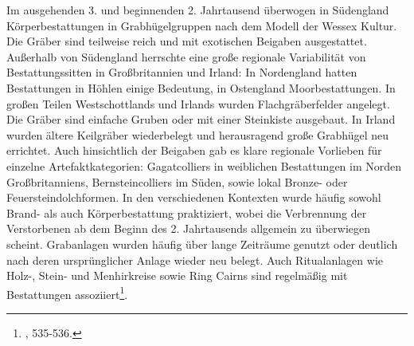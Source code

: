 \documentclass[openany,twoside,twocolumn]{book}
\let\rmarkdownfootnote\footnote%
\def\footnote{\protect\rmarkdownfootnote}
\begin{document}
Im ausgehenden 3. und beginnenden 2. Jahrtausend überwogen in Südengland Körperbestattungen in Grabhügelgruppen nach dem Modell der Wessex Kultur. Die Gräber sind teilweise reich und mit exotischen Beigaben ausgestattet. Außerhalb von Südengland herrschte eine große regionale Variabilität von Bestattungssitten in Großbritannien und Irland: In Nordengland hatten Bestattungen in Höhlen einige Bedeutung, in Ostengland Moorbestattungen. In großen Teilen Westschottlands und Irlands wurden Flachgräberfelder angelegt. Die Gräber sind einfache Gruben oder mit einer Steinkiste ausgebaut. In Irland wurden ältere Keilgräber wiederbelegt und herausragend große Grabhügel neu errichtet. Auch hinsichtlich der Beigaben gab es klare regionale Vorlieben für einzelne Artefaktkategorien: Gagatcolliers in weiblichen Bestattungen im Norden Großbritanniens, Bernsteincolliers im Süden, sowie lokal Bronze- oder Feuersteindolchformen. In den verschiedenen Kontexten wurde häufig sowohl Brand- als auch Körperbestattung praktiziert, wobei die Verbrennung der Verstorbenen ab dem Beginn des 2. Jahrtausends allgemein zu überwiegen scheint. Grabanlagen wurden häufig über lange Zeiträume genutzt oder deutlich nach deren ursprünglicher Anlage wieder neu belegt. Auch Ritualanlagen wie Holz-, Stein- und Menhirkreise sowie Ring Cairns sind regelmäßig mit Bestattungen assoziiert\footnote{\textcite{roberts_britain_2013}, 535-536.}.
\end{document}
